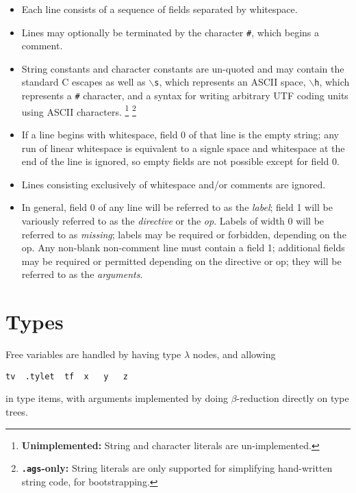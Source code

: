 \documentclass{article}
\newcommand\bs{$\backslash$}
\newcommand\stringcode[1]{\texttt{#1}}
\newcommand\unimpl[1]{\footnote{\textbf{Unimplemented: }#1}}
\newcommand\agsonly[1]{\footnote{\textbf{\texttt{.ags}-only: }#1}}
\begin{document}
\begin{itemize}
    \item Each line consists of a sequence of fields separated by whitespace.

    \item Lines may optionally be terminated by the character \stringcode{\#}, which begins a comment.

    \item String constants and character constants are un-quoted and may contain the standard C escapes as well as
        \stringcode{\bs{}s}, which represents an ASCII space,
        \stringcode{\bs{}h}, which represents a \stringcode{\#} character,
        and a syntax for writing arbitrary UTF coding units using ASCII characters.
        \unimpl{String and character literals are un-implemented.}
        \agsonly{String literals are only supported for simplifying hand-written string code, for bootstrapping.}

    \item If a line begins with whitespace, field 0 of that line is the empty string;
        any run of linear whitespace is equivalent to a signle space and whitespace at the end of the line is ignored,
        so empty fields are not possible except for field 0.

    \item Lines consisting exclusively of whitespace and/or comments are ignored.

    \item In general, field 0 of any line will be referred to as the \emph{label};
        field 1 will be variously referred to as the \emph{directive} or the \emph{op}.
        Labels of width 0 will be referred to as \emph{missing};
        labels may be required or forbidden, depending on the op.
        Any non-blank non-comment line must contain a field 1;
        additional fields may be required or permitted depending on the directive or op;
        they will be referred to as the \emph{arguments}.
\end{itemize}

\section{Types}

Free variables are handled by having type $\lambda$ nodes, and allowing
\begin{verbatim}
tv	.tylet	tf	x	y	z
\end{verbatim}
in type items, with arguments implemented by doing $\beta$-reduction directly on type trees.
\end{document}
